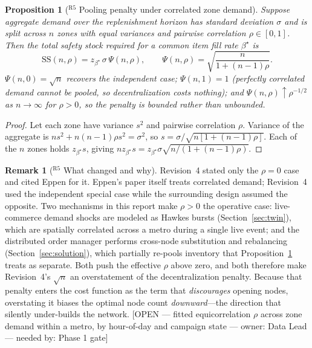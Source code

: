 \documentclass[10pt,twocolumn,letterpaper]{article}
\newtheorem{proposition}{Proposition}
\theoremstyle{definition}
\newtheorem{remark}{Remark}
\newcommand{\OPEN}[3]{{\color{openred}\footnotesize\textsf{[OPEN --- #1 --- owner: #2 --- needed by: #3]}}}
\begin{document}
\begin{proposition}[$^{\mathrm{R5}}$ Pooling penalty under correlated zone demand]\label{prop:pooling}
Suppose aggregate demand over the replenishment horizon has standard deviation $\sigma$ and is split across $n$ zones with equal variances and pairwise correlation $\rho\in[0,1]$. Then the total safety stock required for a common item fill rate $\beta^\star$ is
\begin{equation}\label{eq:pooling}
\mathrm{SS}(n,\rho)=z_{\beta^\star}\,\sigma\,\Psi(n,\rho),\qquad
\Psi(n,\rho)=\sqrt{\frac{n}{1+(n-1)\rho}} .
\end{equation}
$\Psi(n,0)=\sqrt{n}$ recovers the independent case; $\Psi(n,1)=1$ (perfectly correlated demand cannot be pooled, so decentralization costs nothing); and $\Psi(n,\rho)\uparrow\rho^{-1/2}$ as $n\to\infty$ for $\rho>0$, so the penalty is \emph{bounded} rather than unbounded.
\end{proposition}
\begin{proof}
Let each zone have variance $s^2$ and pairwise correlation $\rho$. Variance of the aggregate is $ns^2+n(n-1)\rho s^2=\sigma^2$, so $s=\sigma/\sqrt{n[1+(n-1)\rho]}$. Each of the $n$ zones holds $z_{\beta^\star}s$, giving $n z_{\beta^\star}s = z_{\beta^\star}\sigma\sqrt{n/(1+(n-1)\rho)}$.
\end{proof}

\begin{remark}[$^{\mathrm{R5}}$ What changed and why]
Revision~4 stated only the $\rho=0$ case and cited Eppen \cite{eppen1979} for it. Eppen's paper itself treats correlated demand; Revision~4 used the independent special case while the surrounding design assumed the opposite. Two mechanisms in this report make $\rho>0$ the operative case: live-commerce demand shocks are modeled as Hawkes bursts (Section~\ref{sec:twin}), which are spatially correlated across a metro during a single live event; and the distributed order manager performs cross-node substitution and rebalancing (Section~\ref{sec:solution}), which partially re-pools inventory that Proposition~\ref{prop:pooling} treats as separate. Both push the effective $\rho$ above zero, and both therefore make Revision~4's $\sqrt{n}$ an overstatement of the decentralization penalty. Because that penalty enters the cost function as the term that \emph{discourages} opening nodes, overstating it biases the optimal node count \emph{downward}---the direction that silently under-builds the network. \OPEN{fitted equicorrelation $\rho$ across zone demand within a metro, by hour-of-day and campaign state}{Data Lead}{Phase 1 gate}
\end{remark}
\end{document}
